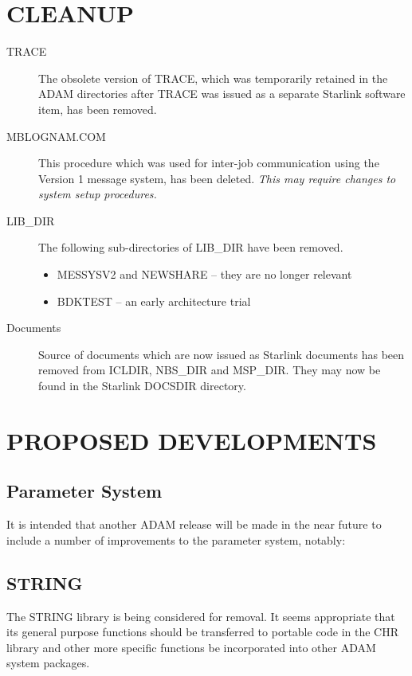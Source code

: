 \section{CLEANUP}
\begin{description}
\item[TRACE] The obsolete version of TRACE, which was temporarily retained in 
the ADAM directories after TRACE was issued as a separate Starlink software 
item, has been removed.
\item[MBLOGNAM.COM]
This procedure which was used for inter-job communication using the Version 1
message system, has been deleted. {\em This may require changes to system setup
procedures.}
\item[LIB\_DIR] The following sub-directories of LIB\_DIR have been removed.
\begin{itemize}
\item MESSYSV2 and NEWSHARE -- they are no longer relevant
\item BDKTEST -- an early architecture trial
\end{itemize}
\item[Documents] Source of documents which are now issued as Starlink 
documents has been removed from ICLDIR, NBS\_DIR and MSP\_DIR.
They may now be found in the Starlink DOCSDIR directory.
\end{description}

\section{PROPOSED DEVELOPMENTS}
\subsection{Parameter System}
It is intended that another ADAM release will be made in the near future to
include a number of improvements to the parameter system, notably:

\subsection{STRING}
The STRING library is being considered for removal. It seems appropriate that
its general purpose functions should be transferred to portable code in the
CHR library and other more specific functions be incorporated into other
ADAM system packages.

